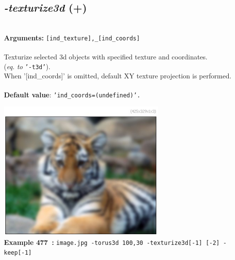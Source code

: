 \documentclass[a4paper,11pt,twoside]{book}
\begin{document}
\subsection{\emph{-texturize3d} (+)}\vspace*{-0.5em}
~\\\textbf{Arguments: } 
{\small \texttt{[ind\_texture],\_[ind\_coords]}}\\~\\
Texturize selected 3d objects with specified texture and coordinates.
~\\(\emph{eq. to} {\small \texttt{'-t3d'}}).
~\\When '[ind\_coords]' is omitted, default XY texture projection is performed.
~\\~\\\textbf{Default value}: {\small \texttt{'ind\_coords=(undefined)'.}}
\begin{center}\includegraphics[keepaspectratio=true,height=7cm,width=\textwidth]{img/gmic_def477.jpg}\\
{\footnotesize \textbf{Example 477~:} \texttt{image.jpg -torus3d 100,30 -texturize3d[-1] [-2] -keep[-1]}}
\end{center}
\end{document}
